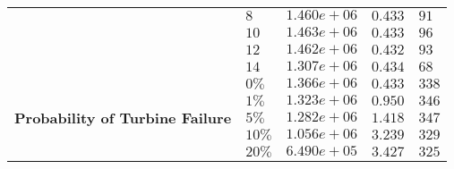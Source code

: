 \begin{tabular}{l|llll}
&                                                        $8$                      & $1.460e+06$ & $0.433$ & $91$ \\ 
&                                                        $10$                     & $1.463e+06$ & $0.433$ & $96$ \\ 
&                                                        $12$                     & $1.462e+06$ & $0.432$ & $93$ \\ 
&                                                        $14$                     & $1.307e+06$ & $0.434$ & $68$ \\ \hline 
\multirow{5}{*}{\textbf{Probability of Turbine Failure}} & $0\%$          & $1.366e+06$ & $0.433$ & $338$ \\ 
&                                                                  $1\%$          & $1.323e+06$ & $0.950$ & $346$ \\ 
&                                                                  $5\%$          & $1.282e+06$ & $1.418$ & $347$ \\ 
&                                                                  $10\%$         & $1.056e+06$ & $3.239$ & $329$ \\ 
&                                                                  $20\%$         & $6.490e+05$ & $3.427$ & $325$ 
\end{tabular}